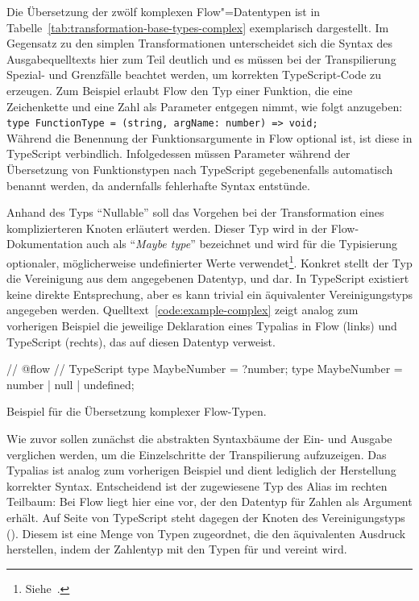 Die Übersetzung der zwölf komplexen Flow"=Datentypen ist in Tabelle~\ref{tab:transformation-base-types-complex} exemplarisch dargestellt. Im Gegensatz zu den simplen Transformationen unterscheidet sich die Syntax des Ausgabequelltexts hier zum Teil deutlich und es müssen bei der Transpilierung Spezial- und Grenzfälle beachtet werden, um korrekten TypeScript-Code zu erzeugen. Zum Beispiel erlaubt Flow den Typ einer Funktion, die eine Zeichenkette und eine Zahl als Parameter entgegen nimmt, wie folgt anzugeben:\\[.5\baselineskip]
\texttt{type FunctionType = (string, argName: number) => void;}\\[.5\baselineskip]
Während die Benennung der Funktionsargumente in Flow optional ist, ist diese in TypeScript verbindlich. Infolgedessen müssen Parameter während der Übersetzung von Funktionstypen nach TypeScript gegebenenfalls automatisch benannt werden, da andernfalls fehlerhafte Syntax entstünde.

\bigbreak


Anhand des Typs \enquote{Nullable} soll das Vorgehen bei der Transformation eines komplizierteren Knoten erläutert werden. Dieser Typ wird in der Flow-Dokumentation auch als \enquote{\textit{Maybe type}} bezeichnet und wird für die Typisierung optionaler, möglicherweise undefinierter Werte verwendet\footnote{Siehe~\autocite[Maybe Types]{FLOW:TYPE_ANNOTATIONS}.}. Konkret stellt der Typ die Vereinigung aus dem angegebenen Datentyp,  und  dar. In TypeScript existiert keine direkte Entsprechung, aber es kann trivial ein äquivalenter Vereinigungstyps angegeben werden. Quelltext~\ref{code:example-complex} zeigt analog zum vorherigen Beispiel die jeweilige Deklaration eines Typalias in Flow (links) und TypeScript (rechts), das auf diesen Datentyp verweist.

\bigbreak
\begin{listing}[htb]
\begin{textcode}
// @flow                               // TypeScript
type MaybeNumber = ?number;           type MaybeNumber = number | null | undefined;
\end{textcode}
\listingvspace
\caption{Beispiel für die Übersetzung komplexer Flow-Typen.}
\label{code:example-complex}
\end{listing}

Wie zuvor sollen zunächst die abstrakten Syntaxbäume der Ein- und Ausgabe verglichen werden, um die Einzelschritte der Transpilierung aufzuzeigen. Das Typalias ist analog zum vorherigen Beispiel und dient lediglich der Herstellung korrekter Syntax. Entscheidend ist der zugewiesene Typ des Alias im rechten Teilbaum: Bei Flow liegt hier eine  vor, der den Datentyp für Zahlen als Argument erhält. Auf Seite von TypeScript steht dagegen der Knoten des Vereinigungstyps (). Diesem ist eine Menge von Typen zugeordnet, die den äquivalenten Ausdruck herstellen, indem der Zahlentyp mit den Typen für  und  vereint wird.


